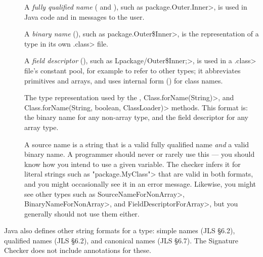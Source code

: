 \begin{description}

\item[]
  A \emph{fully qualified name} ( and ), such as
  \<package.Outer.Inner>, is used in Java code and in messages to
  the user.

\item[]
  A \emph{binary name} (), such as
  \<package.Outer\$Inner>, is
  the representation of a type in its own \<.class> file.

\item[]
  A \emph{field descriptor} (), such as
  \<Lpackage/Outer\$Inner;>, is used in a \<.class> file's constant pool,
  for example to refer to other types; it abbreviates primitives and
  arrays, and uses internal form () for class names.

\item[]
  The type representation used by the ,
  \<Class.forName(String)>, and \<Class.forName(String, boolean,
  ClassLoader)> methods.  This format is:  the binary name for any
  non-array type, and the field descriptor for any array type.

\item[]
  A source name is a string that is a valid fully qualified name \emph{and}
  a valid binary name.  A programmer should never or rarely use this --- you should
  know how you intend to use a given variable.  The checker infers it for
  literal strings such as \<"package.MyClass"> that are valid in both
  formats, and you might occasionally see it in an error message.
  Likewise, you might see other types such as \<SourceNameForNonArray>,
  \<BinaryNameForNonArray>, and \<FieldDescriptorForArray>, but you
  generally should not use them either.

\end{description}

Java also defines other string formats for a type: simple
names (JLS \S 6.2), qualified names (JLS \S 6.2), and canonical
names (JLS \S 6.7).  The Signature Checker does not include annotations
for these.


